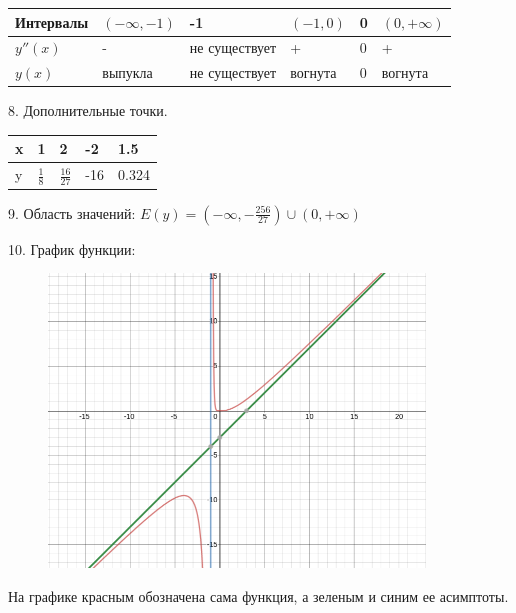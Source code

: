\begin{table}[h]
\begin{tabular}{|l|l|l|l|l|l|}
\hline
Интервалы & $(-\infty,-1)$ & -1            & $(-1,0)$ & 0 & $(0,+\infty)$ \\ \hline
$y''(x)$  & -              & не существует & +        & 0 & +             \\ \hline
$y(x)$    & выпукла        & не существует & вогнута  & 0 & вогнута       \\ \hline
\end{tabular}
\end{table}

8. Дополнительные точки.

\begin{table}[h]
\begin{tabular}{|l|l|l|l|l|}
\hline
x & 1             & 2               & -2  & 1.5   \\ \hline
y & $\frac{1}{8}$ & $\frac{16}{27}$ & -16 & 0.324 \\ \hline
\end{tabular}
\end{table}

9. Область значений: $E(y) = (- \infty, -\frac{256}{27}) \cup (0, +\infty)$

10. График функции: 

\begin{figure}[h!]
    \centering
    \includegraphics[width=10cm]{img/graf_var4.png}
\end{figure}

На графике красным обозначена сама функция, а зеленым и синим ее асимптоты.